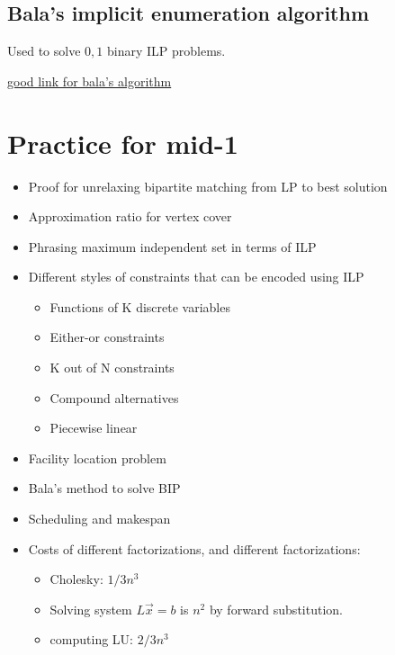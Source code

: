 \documentclass[11pt]{book}
\begin{document}
\section{Bala's implicit enumeration algorithm}
Used to solve $0, 1$ binary ILP problems.

\href{https://www.sce.carleton.ca/faculty/chinneck/po/Chapter13.pdf}{good link for bala's algorithm}

\chapter{Practice for mid-1}
\begin{itemize}
    \item Proof for unrelaxing bipartite matching from LP to best solution
    \item Approximation ratio for vertex cover
    \item Phrasing maximum independent set in terms of ILP
    \item Different styles of constraints that can be encoded using ILP
        \begin{itemize}
            \item Functions of K discrete variables
            \item Either-or constraints
            \item K out of N constraints
            \item Compound alternatives
            \item Piecewise linear
        \end{itemize}
    \item Facility location problem
    \item Bala's method to solve BIP
    \item Scheduling and makespan
    \item Costs of different factorizations, and different factorizations:
        \begin{itemize}
            \item Cholesky: $1/3n^3$
            \item Solving system $L \vec x = b$ is $n^2$ by forward substitution.
            \item computing LU: $2/3n^3$
        \end{itemize}
\end{itemize}
\end{document}
